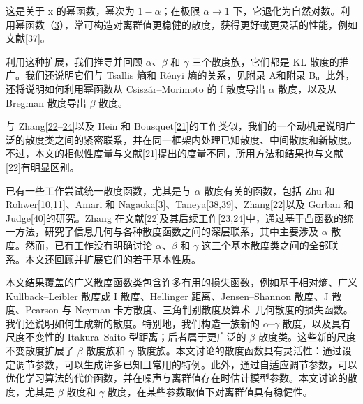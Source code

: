 这是关于 x 的幂函数，幂次为 \(1 - \alpha\)；在极限 \(\left. \alpha\rightarrow 1 \right.\) 下，它退化为自然对数。利用幂函数（\hyperref[FD3-entropy-12-01532]{3}），常可构造对离群值更稳健的散度，获得更好或更灵活的性能，例如文献[\hyperlink{B37-entropy-12-01532}{37}]。


利用这种扩展，我们推导并回顾 \(\alpha\)、\(\beta\) 和 \(\gamma\) 三个散度族，它们都是 KL 散度的推广。我们还说明它们与 Tsallis 熵和 Rényi 熵的关系，见\hyperref[app1-entropy-12-01532]{附录 A}和\hyperref[app2-entropy-12-01532]{附录 B}。此外，还将说明如何利用幂函数从 Csiszár–Morimoto 的 f 散度导出 \(\alpha\) 散度，以及从 Bregman 散度导出 \(\beta\) 散度。


与 Zhang[\hyperlink{B22-entropy-12-01532}{22}--\hyperlink{B24-entropy-12-01532}{24}]以及 Hein 和 Bousquet[\hyperlink{B21-entropy-12-01532}{21}]的工作类似，我们的一个动机是说明广泛的散度类之间的紧密联系，并在同一框架内处理已知散度、中间散度和新散度。不过，本文的相似性度量与文献[\hyperlink{B21-entropy-12-01532}{21}]提出的度量不同，所用方法和结果也与文献[\hyperlink{B22-entropy-12-01532}{22}]有明显区别。


已有一些工作尝试统一散度函数，尤其是与 \(\alpha\) 散度有关的函数，包括 Zhu 和 Rohwer[\hyperlink{B10-entropy-12-01532}{10},\allowbreak \hyperlink{B11-entropy-12-01532}{11}]、Amari 和 Nagaoka[\hyperlink{B3-entropy-12-01532}{3}]、Taneya[\hyperlink{B38-entropy-12-01532}{38},\allowbreak \hyperlink{B39-entropy-12-01532}{39}]、Zhang[\hyperlink{B22-entropy-12-01532}{22}]以及 Gorban 和 Judge[\hyperlink{B40-entropy-12-01532}{40}]的研究。Zhang 在文献[\hyperlink{B22-entropy-12-01532}{22}]及其后续工作[\hyperlink{B23-entropy-12-01532}{23},\allowbreak \hyperlink{B24-entropy-12-01532}{24}]中，通过基于凸函数的统一方法，研究了信息几何与各种散度函数之间的深层联系，其中主要涉及 \(\alpha\) 散度。然而，已有工作没有明确讨论 \(\alpha\)、\(\beta\) 和 \(\gamma\) 这三个基本散度类之间的全部联系。本文还回顾并扩展它们的若干基本性质。


本文结果覆盖的广义散度函数类包含许多有用的损失函数，例如基于相对熵、广义 Kullback–Leibler 散度或 I 散度、Hellinger 距离、Jensen–Shannon 散度、J 散度、Pearson 与 Neyman 卡方散度、三角判别散度及算术–几何散度的损失函数。我们还说明如何生成新的散度。特别地，我们构造一族新的 \(\alpha\)–\(\gamma\) 散度，以及具有尺度不变性的 Itakura–Saito 型距离；后者属于更广泛的 \(\beta\) 散度类。这些新的尺度不变散度扩展了 \(\beta\) 散度族和 \(\gamma\) 散度族。本文讨论的散度函数具有灵活性：通过设定调节参数，可以生成许多已知且常用的特例。此外，通过自适应调节参数，可以优化学习算法的代价函数，并在噪声与离群值存在时估计模型参数。本文讨论的散度，尤其是 \(\beta\) 散度和 \(\gamma\) 散度，在某些参数取值下对离群值具有稳健性。


